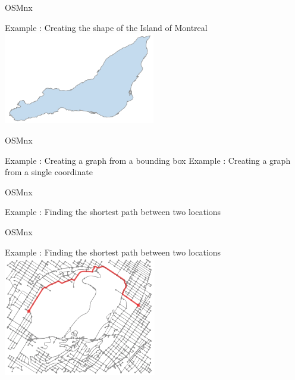 \documentclass[aspectratio=169]{beamer}
\begin{document}
\begin{frame}{OSMnx \cite{boeing2017osmnx}}

{\Large Example : Creating the shape of the Island of Montreal}
{\small }
\centering
\includegraphics[height=4cm]{figures/montreal_shape}

\end{frame}

\begin{frame}{OSMnx \cite{boeing2017osmnx}}

{\Large Example : Creating a graph from a bounding box}
{\small }
\vspace{.5cm}
{\Large Example : Creating a graph from a single coordinate}
{\small }

\end{frame}

\begin{frame}{OSMnx \cite{boeing2017osmnx}}

{\Large Example : Finding the shortest path between two locations}
{\footnotesize }

\end{frame}

\begin{frame}{OSMnx \cite{boeing2017osmnx}}

{\Large Example : Finding the shortest path between two locations}
\centering
\includegraphics[width=0.5\textwidth]{figures/shortest_path}

\end{frame}
\end{document}
